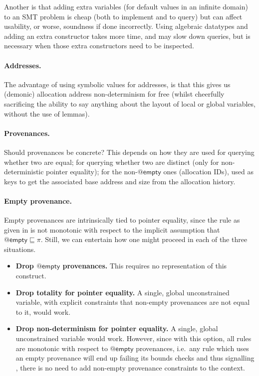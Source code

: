 Another is that adding extra variables (for default values in an infinite
domain) to an SMT problem is cheap (both to implement and to query) but can
affect usability, or worse, soundness if done incorrectly. Using algebraic
datatypes and adding an extra constructor takes more time, and may slow down
queries, but is necessary when those extra constructors need to be inspected.

\paragraph{Addresses.}%
The advantage of using symbolic values for addresses, is that this gives us
(demonic) allocation address non-determinism for free (whilst cheerfully
sacrificing the ability to say anything about the layout of local or global
variables, without the use of lemmas).

\paragraph{Provenances.}%
Should provenances be concrete? This depends on how they are used \textemdash{}
for querying whether two are equal; for querying whether two are distinct (only
for non-deterministic pointer equality); for the non-$@\mathsf{empty}$ ones
(allocation IDs), used as keys to get the associated base address and size from
the allocation history.

\paragraph{Empty provenance.}%
Empty provenances are intrinsically tied to pointer equality, since the rule
as given in  is not monotonic with respect to the implicit assumption
that $@\mathsf{empty} \sqsubseteq \pi$. Still, we can entertain how one might
proceed in each of the three situations.
\begin{itemize}
    \item \textbf{Drop $@\mathsf{empty}$ provenances.} This requires
        no representation of this construct.
    \item \textbf{Drop totality for pointer equality.}
        A single, global unconstrained variable, with explicit constraints that
        non-empty provenances are not equal to it, would work.
    \item \textbf{Drop non-determinism for pointer equality.}
        A single, global unconstrained variable would work. However, since with
        this option, all rules are monotonic with respect to $@\mathsf{empty}$
        provenances, i.e.\ any rule which uses an empty provenance will end up
        failing its bounds checks and thus signalling , there is no need
        to add non-empty provenance constraints to the context.
\end{itemize}

